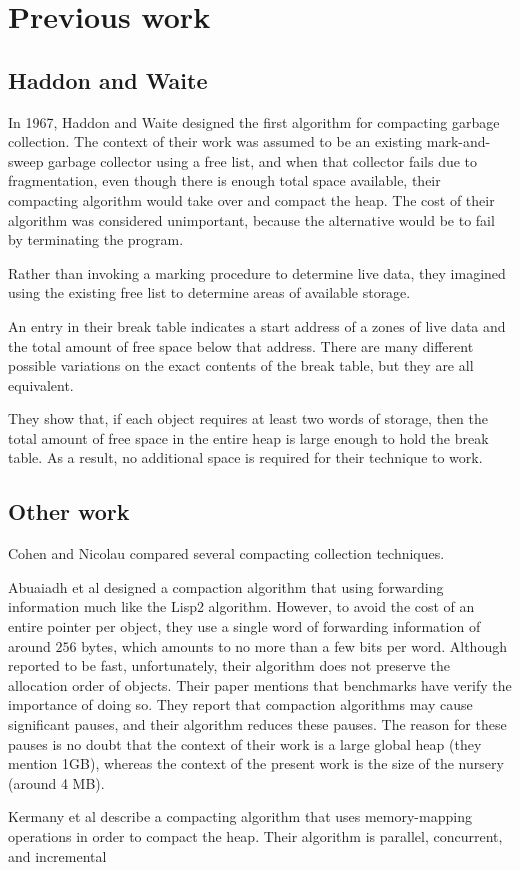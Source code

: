 \section{Previous work}

\subsection{Haddon and Waite}

In 1967, Haddon and Waite \cite{Haddon:1967} designed the first
algorithm for compacting garbage collection.  The context of their
work was assumed to be an existing mark-and-sweep garbage collector
using a free list, and when that collector fails due to fragmentation,
even though there is enough total space available, their compacting
algorithm would take over and compact the heap.  The cost of their
algorithm was considered unimportant, because the alternative would be
to fail by terminating the program.

Rather than invoking a marking procedure to determine live data, they
imagined using the existing free list to determine areas of available
storage. 

An entry in their break table indicates a start address of a zones of
live data and the total amount of free space below that address.
There are many different possible variations on the exact contents of
the break table, but they are all equivalent.

They show that, if each object requires at least two words of storage,
then the total amount of free space in the entire heap is large enough
to hold the break table.  As a result, no additional space is
required for their technique to work.

\subsection{Other work}

Cohen and Nicolau \cite{Cohen:1983:CCA:69575.357226} compared several
compacting collection techniques.

Abuaiadh et al \cite{Abuaiadh:2004:EPH:1028976.1028995} designed a
compaction algorithm that using forwarding information much like the
Lisp2 algorithm.  However, to avoid the cost of an entire pointer per
object, they use a single word of forwarding information of around
$256$ bytes, which amounts to no more than a few bits per word.
Although reported to be fast, unfortunately, their algorithm does not
preserve the allocation order of objects.  Their paper mentions that
benchmarks have verify the importance of doing so.  They report that
compaction algorithms may cause significant pauses, and their
algorithm reduces these pauses.  The reason for these pauses is no
doubt that the context of their work is a large global heap (they
mention 1GB), whereas the context of the present work is the size of
the nursery (around 4 MB).

Kermany et al \cite{Kermany:2006:CCI:1133981.1134023} describe a
compacting algorithm that uses memory-mapping operations in order to
compact the heap.  Their algorithm is parallel, concurrent, and
incremental
